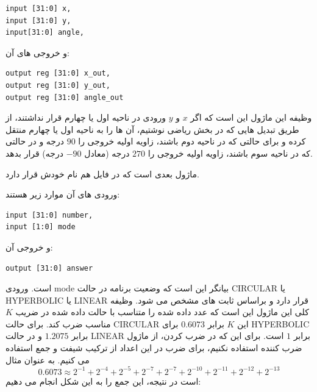 \documentclass[12pt,titlepage,a4page , tikz , multi,table , svgnames,xcdraw]{article}
\begin{document}
\begin{latin}
\begin{verbatim}
input [31:0] x,
input [31:0] y,
input[31:0] angle,
\end{verbatim}
\end{latin}

و خروجی های آن:

\begin{latin}
\begin{verbatim}
output reg [31:0] x_out,
output reg [31:0] y_out,
output reg [31:0] angle_out
\end{verbatim}
\end{latin}

وظیفه این ماژول این است که اگر $x$ و $y$ ورودی در ناحیه اول یا چهارم قرار نداشتند، از طریق تبدیل هایی که در بخش ریاضی نوشتیم، آن ها را به ناحیه اول یا چهارم منتقل کرده و برای حالتی که در ناحیه دوم باشند، زاویه اولیه خروجی را $90$ درجه و در حالتی که در ناحیه سوم باشند، زاویه اولیه خروجی را $270$ درجه (معادل $-90$ درجه) قرار بدهد.

\hrulefill

ماژول بعدی  است که در فایل هم نام خودش قرار دارد.

 
 ورودی های آن موارد زیر هستند:

\begin{latin}
\begin{verbatim}
input [31:0] number,
input [1:0] mode
\end{verbatim}
\end{latin}

و خروجی آن:

\begin{latin}
\begin{verbatim}
output [31:0] answer
\end{verbatim}
\end{latin}

است. ورودی mode بیانگر این است که وضعیت برنامه در حالت CIRCULAR یا HYPERBOLIC یا LINEAR قرار دارد و براساس ثابت های  مشخص می شود. وظیفه کلی این ماژول این است که عدد داده شده را متناسب با حالت داده شده در ضریب $K$ مناسب ضرب کند. برای حالت CIRCULAR این $K$ برابر $0.6073$ برای HYPERBOLIC برابر $1.2075$ و در حالت LINEAR برابر $1$ است. برای این که در ضرب کردن، از ماژول ضرب کننده استفاده نکنیم، برای ضرب در این اعداد از ترکیب شیفت و جمع استفاده می کنیم. به عنوان مثال
$$0.6073 \approx 2^{-1} + 2^{-4} + 2^{-5} + 2^{-7} + 2^{-7} + 2^{-10} + 2^{-11} + 2^{-12} + 2^{-13}$$
است در نتیجه، این جمع را به این شکل انجام می دهیم:
\end{document}
